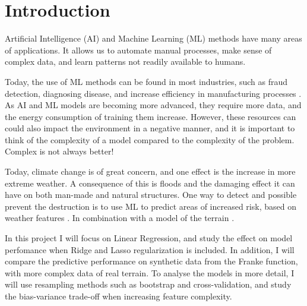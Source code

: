 \section{Introduction}\label{sec:introduction}

Artificial Intelligence (AI) and Machine Learning (ML) methods have many areas of applications. It allows us to automate manual processes, make sense of complex data, and learn patterns not readily available to humans. 

Today, the use of ML methods can be found in most industries, such as fraud detection, diagnosing disease, and increase efficiency in manufacturing processes \cite{forbes:2023:machine_learning}. As AI and ML models are becoming more advanced, they require more data, and the energy consumption of training them increase. However, these resources can could also impact the environment in a negative manner, and it is important to think of the complexity of a model compared to the complexity of the problem. Complex is not always better! 

Today, climate change is of great concern, and one effect is the increase in more extreme weather. A consequence of this is floods and the damaging effect it can have on both man-made and natural structures. One way to detect and possible prevent the destruction is to use ML to predict areas of increased risk, based on weather features \cite{supriya:2015:regression_analysis}. In combination with a model of the terrain \cite{opengeohub:2020:eu_terrain}.

In this project I will focus on Linear Regression, and study the effect on model perfomance when Ridge and Lasso regularization is included. In addition, I will compare the predictive performance on synthetic data from the Franke function, with more complex data of real terrain. To analyse the models in more detail, I will use resampling methods such as bootstrap and cross-validation, and study the bias-variance trade-off when increasing feature complexity.

